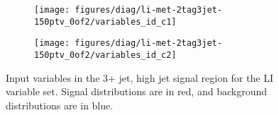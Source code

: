 \begin{figure}[!htbp]\captionsetup{justification=centering}
  \centering
\begin{subfigure}[t]{0.49\textwidth}\centering\texttt{[image: figures/diag/li-met-2tag3jet-150ptv\_0of2/variables\_id\_c1]}\end{subfigure}
\begin{subfigure}[t]{0.49\textwidth}\centering\texttt{[image: figures/diag/li-met-2tag3jet-150ptv\_0of2/variables\_id\_c2]}\end{subfigure}
  \caption{Input variables in the 3+ jet, high jet signal region for the LI variable set.  Signal distributions are in red, and background distributions are in blue.}
  \label{fig:li-met3jet-150ptv-inputs}
\end{figure}

